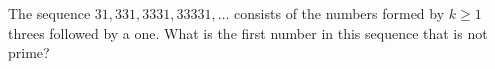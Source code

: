 The sequence $31,331,3331,33331,\dots$ consists of the numbers formed by $k\ge1$ threes followed by a one. What is the first number in this sequence that is not prime?
